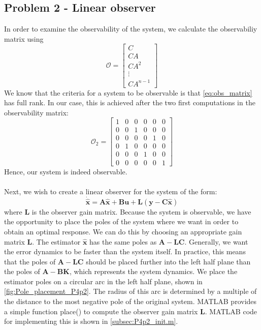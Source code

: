 \subsection{Problem 2 - Linear observer}\label{subsec:P4p2}
In order to examine the observability of the system, we calculate the observabiliy matrix using
\begin{equation}\label{eq:obs_matrix}
    {\mathcal {O}}={\begin{bmatrix}C\\CA\\CA^{2}\\\vdots \\CA^{n-1}\end{bmatrix}}
\end{equation}
We know that the criteria for a system to be observable is that \eqref{eq:obs_matrix} has full rank. In our case, this is achieved after the two first computations in the observability matrix:
\begin{equation}\label{eq:obs_matrix_calc}
    {\mathcal {O}}_{2}=
    {\begin{bmatrix}
        1 & 0 & 0 & 0 & 0 & 0\\
        0 & 0 & 1 & 0 & 0 & 0\\
        0 & 0 & 0 & 0 & 1 & 0\\
        0 & 1 & 0 & 0 & 0 & 0\\
        0 & 0 & 0 & 1 & 0 & 0\\
        0 & 0 & 0 & 0 & 0 & 1
    \end{bmatrix}}
\end{equation}
Hence, our system is indeed observable.\\
\\
Next, we wish to create a linear observer for the system of the form:
\begin{equation}\label{observer_system}
    \mathbf{\dot{\hat{x}} = A\hat{x} + Bu + L(y - C\hat{x})}
\end{equation}
where \textbf{L} is the observer gain matrix.
Because the system is observable, we have the opportunity to place the poles of the system where we want in order to obtain an optimal response. We can do this by choosing an appropriate gain matrix \textbf{L}. The estimator $\mathbf{\hat{x}}$ has the same poles as $\mathbf{A - LC}$. Generally, we want the error dynamics to be faster than the system itself. In practice, this means that the poles of $\mathbf{A - LC}$ should be placed further into the left half plane than the poles of $\mathbf{A - BK}$, which represents the system dynamics. We place the estimator poles on a circular arc in the left half plane, shown in \cref{fig:Pole_placement_P4p2}. The radius of this arc is determined by a multiple of the distance to the most negative pole of the original system. MATLAB provides a simple function place() to compute the observer gain matrix \textbf{L}. MATLAB code for implementing this is shown in \cref{subsec:P4p2_init.m}.
